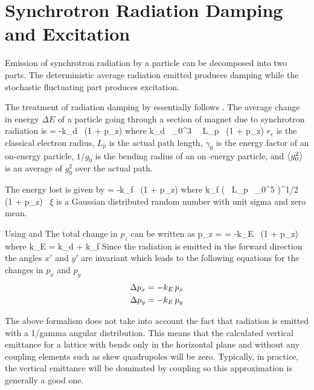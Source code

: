 \section{Synchrotron Radiation Damping and Excitation}
\label{s:radiation}

Emission of synchrotron radiation by a particle can be decomposed into
two parts. The deterministic average radiation emitted produces damping
while the stochastic fluctuating part produces excitation\cite{b:jowett}.

The treatment of radiation damping by \bmad essentially follows \mad.
The average change in energy $\Delta E$ of a particle going through a
section of magnet due to synchrotron radiation is
\Begineq
   = -k_d \, (1 + p_z)
\Endeq
where
\Begineq
  k_d \equiv {} \, \gamma_0^3 \,  \, L_p \,  
  (1 + p_z)
  \label{k2r3g}
\Endeq
$r_e$ is the classical electron radius, $L_p$ is the actual path
length, $\gamma_0$ is the energy factor of an on-energy particle, $1/g_0$
is the bending radius of an on--energy particle, and $\left\langle g_0^2 \right\rangle$ is an
average of $g_0^2$ over the actual path.

The energy lost is given by
\Begineq
   = -k_f \, (1 + p_z)
\Endeq
where
\Begineq
  k_f \equiv \left(  \, 
  L_p \, \gamma_0^5  \right)^{1/2} \, (1 + p_z) \, \xi
  \label{k55rh}
\Endeq
$\xi$ is a Gaussian distributed random number with unit sigma and zero mean.

Using  and  The total change in $p_z$ can be written as
\Begineq
  \Delta p_z =  = -k_E \, (1 + p_z)
\Endeq
where
\Begineq
  k_E = k_d + k_f
\Endeq
Since the radiation is emitted in the forward direction the angles
$x'$ and $y'$ are invariant which leads to the following equations for
the changes in $p_x$ and $p_y$
\begin{align}
  \Delta p_x &= -k_E \, p_x \nonumber \\
  \Delta p_y &= -k_E \, p_y 
\end{align}

The above formalism does not take into account the fact that radiation is 
emitted with a 1/gamma angular distribution. This means that the calculated
vertical emittance for a lattice with
bends only in the horizontal plane and without any coupling elements such as
skew quadrupoles will be zero. Typically, in practice, the vertical emittance
will be dominated by coupling so this approximation is generally a good one.

